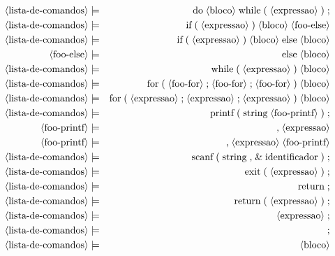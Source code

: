 \documentclass[12pt,a4papper]{article}
\newcommand{\pn}[1]{\langle \textnormal{#1} \rangle}
\newcommand{\pp}{\models}
\newcommand{\ww}{\;}
\newcommand{\sm}[1]{\textnormal{#1}}
\begin{document}
\begin{landscape}
\begin{eqnarray}
\pn{lista-de-comandos} &\pp& \sm{do} \ww \pn{bloco} \ww \sm{while} \ww \sm{(} \ww \pn{expressao} \ww \sm{)} \ww \sm{;} \\
\pn{lista-de-comandos} &\pp& \sm{if} \ww \sm{(} \ww \pn{expressao} \ww \sm{)} \ww \pn{bloco} \ww \pn{foo-else} \\
\pn{lista-de-comandos} &\pp& \sm{if} \ww \sm{(} \ww \pn{expressao} \ww \sm{)} \ww \pn{bloco} \ww \sm{else} \ww \pn{bloco} \\ 
\pn{foo-else} &\pp& \sm{else} \ww \pn{bloco} \\  
\pn{lista-de-comandos} &\pp& \sm{while} \ww \sm{(} \ww \pn{expressao} \ww \sm{)} \ww \pn{bloco}\\
\pn{lista-de-comandos} &\pp& \sm{for} \ww \sm{(} \ww \pn{foo-for} \ww \sm{;} \ww \pn{foo-for} \ww \sm{;} \ww \pn{foo-for} \ww \sm{)} \ww \pn{bloco}   \\
\pn{lista-de-comandos} &\pp& \sm{for} \ww \sm{(} \ww \pn{expressao} \ww \sm{;} \ww \pn{expressao} \ww \sm{;} \ww \pn{expressao} \ww \sm{)} \ww \pn{bloco}   \\
\pn{lista-de-comandos} &\pp& \sm{printf} \ww \sm{(} \ww \sm{string} \ww \pn{foo-printf} \ww \sm{)} \ww \sm{;}\\
       \pn{foo-printf} &\pp&  \sm{,} \ww \pn{expressao} \\
       \pn{foo-printf} &\pp&  \sm{,} \ww \pn{expressao} \ww \pn{foo-printf}\\
\pn{lista-de-comandos} &\pp&  \sm{scanf} \ww \sm{(} \ww \sm{string} \ww \sm{,} \ww \sm{\&} \ww \sm{identificador} \ww \sm{)} \ww \sm{;} \\
\pn{lista-de-comandos} &\pp&  \sm{exit} \ww \sm{(} \ww \pn{expressao} \ww \sm{)} \ww \sm{;} \\
\pn{lista-de-comandos} &\pp&  \sm{return} \ww \sm{;} \\
\pn{lista-de-comandos} &\pp&  \sm{return} \ww \sm{(} \ww \pn{expressao} \ww \sm{)} \ww  \sm{;} \\
\pn{lista-de-comandos} &\pp&  \pn{expressao} \ww \sm{;} \\
\pn{lista-de-comandos} &\pp&  \sm{;} \\
\pn{lista-de-comandos} &\pp&  \pn{bloco}
\end{eqnarray}




\end{landscape}
\end{document}
